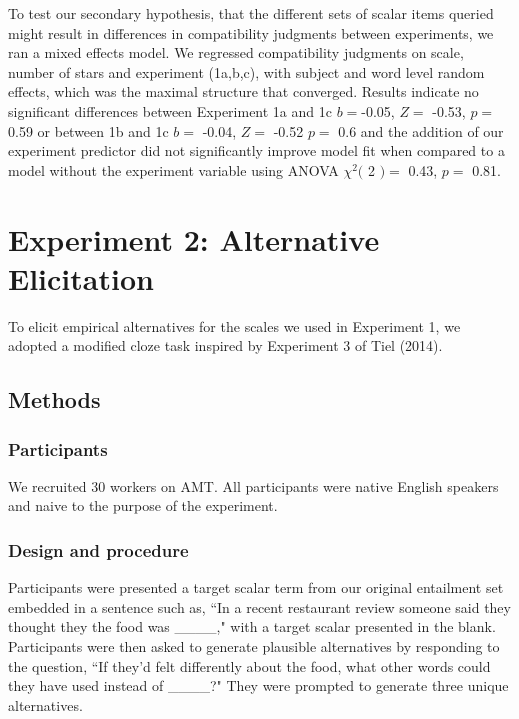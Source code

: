 \documentclass[10pt, letterpaper]{article}
\begin{document}
To test our secondary hypothesis, that the different sets of scalar
items queried might result in differences in compatibility judgments
between experiments, we ran a mixed effects model. We regressed
compatibility judgments on scale, number of stars and experiment
(1a,b,c), with subject and word level random effects, which was the
maximal structure that converged. Results indicate no significant
differences between Experiment 1a and 1c \(b =\)-0.05, \(Z =\) -0.53,
\(p =\) 0.59 or between 1b and 1c \(b =\) -0.04, \(Z =\) -0.52 \(p =\)
0.6 and the addition of our experiment predictor did not significantly
improve model fit when compared to a model without the experiment
variable using ANOVA \(\chi^2(\) 2 \() =\) 0.43, \(p =\) 0.81.

\section{Experiment 2: Alternative
Elicitation}\label{experiment-2-alternative-elicitation}

To elicit empirical alternatives for the scales we used in Experiment 1,
we adopted a modified cloze task inspired by Experiment 3 of Tiel
(2014).

\subsection{Methods}\label{methods-1}

\subsubsection{Participants}\label{participants-1}

We recruited 30 workers on AMT. All participants were native English
speakers and naive to the purpose of the experiment.

\subsubsection{Design and procedure}\label{design-and-procedure-1}

Participants were presented a target scalar term from our original
entailment set embedded in a sentence such as, ``In a recent restaurant
review someone said they thought they the food was \_\_\_\_," with a
target scalar presented in the blank. Participants were then asked to
generate plausible alternatives by responding to the question, ``If
they'd felt differently about the food, what other words could they have
used instead of \_\_\_\_?" They were prompted to generate three unique
alternatives.
\end{document}
